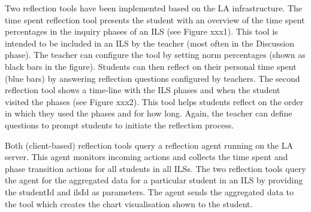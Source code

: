 
Two reflection tools have been implemented based on the LA infrastructure.
The time spent reflection tool presents the student with an overview of the
time spent percentages in the inquiry phases of an ILS (see Figure xxx1).
This tool is intended to be included in an ILS by the teacher (most often in
the Discussion phase).  The teacher can configure the tool by setting norm
percentages (shown as black bars in the figure).  Students can then reflect on
their personal time spent (blue bars) by answering reflection questions
configured by teachers.  The second reflection tool shows a time-line with the
ILS phases and when the student visited the phases (see Figure xxx2).  This
tool helps students reflect on the order in which they used the phases and for
how long.  Again, the teacher can define questions to prompt students to
initiate the reflection process.

Both (client-based) reflection tools query a reflection agent running on the
LA server.  This agent monitors incoming actions and collects the time spent
and phase transition actions for all students in all ILSs.  The two reflection
tools query the agent for the aggregated data for a particular student in an
ILS by providing the studentId and ilsId as parameters.  The agent sends the
aggregated data to the tool which creates the chart visualisation shown to the
student.
